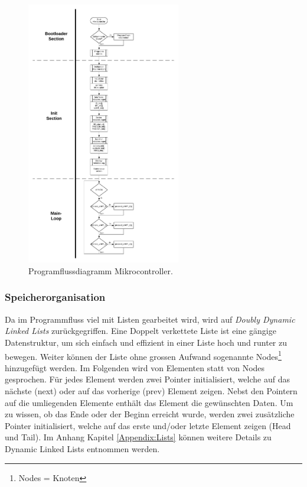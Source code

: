 \newpage

\begin{figure}[h!]
	\centering
	\includegraphics[width=0.6\textwidth]{graphics/Programmfluss_Atmega2560.pdf}
	\caption{Programflussdiagramm Mikrocontroller.}
	\label{fig:Programmfluss_Atmega2560}
\end{figure}
\newpage


\subsubsection{Speicherorganisation}\label{subsubsec:Speicherorganisation}

Da im Programmfluss viel mit Listen gearbeitet wird, wird auf \textit{Doubly Dynamic Linked Lists} zurückgegriffen.
Eine Doppelt verkettete Liste ist eine gängige Datenstruktur, um sich einfach und effizient in einer Liste hoch und runter zu bewegen. Weiter können der Liste ohne grossen Aufwand sogenannte Nodes\footnote{Nodes = Knoten} hinzugefügt werden. Im Folgenden wird von Elementen statt von Nodes gesprochen. Für jedes Element werden zwei Pointer initialisiert, welche auf das nächste (next) oder auf das vorherige (prev) Element zeigen. Nebst den Pointern auf die umliegenden Elemente enthält das Element die gewünschten Daten. Um zu wissen, ob das Ende oder der Beginn erreicht wurde, werden zwei zusätzliche Pointer initialisiert, welche auf das erste und/oder letzte Element zeigen (Head und Tail). Im Anhang Kapitel \ref{Appendix:Lists} können weitere Details zu Dynamic Linked Lists entnommen werden.\cite{lenz_artikel_2016}

